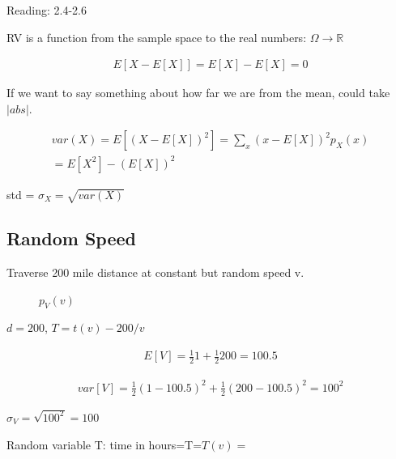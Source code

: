 
 Reading: 2.4-2.6

RV is a function from the sample space to the real numbers: $\Omega \rightarrow \mathbb{R}$


\begin{align*}
E[X-E[X]] = E[X] - E[X] = 0
\end{align*}

If we want to say something about how far we are from the mean, could take $|abs|$.

\begin{align}
var(X)=E[(X-E[X])^2] = \sum_x(x - E[X])^2 p_X(x)\\
= E[X^2] -(E[X])^2
\end{align}

std = $\sigma_X = \sqrt{var(X)}$

\subsection{Random Speed}


Traverse 200 mile distance at constant but random speed v.


\begin{figure}[ht]
\caption{$p_V(v)$}
\end{figure}

$d=200$, $T=t(v)-200/v$

\begin{align*}
E[V] = \frac{1}{2}1 + \frac{1}{2}200 = 100.5
\end{align*}

\begin{align*}
var[V] = \frac{1}{2}(1-100.5)^2 + \frac{1}{2}(200 -100.5)^2 = 100^2
\end{align*}

$\sigma_V = \sqrt{100^2}=100$


Random variable T: time in hours=T=$T(v)=$

